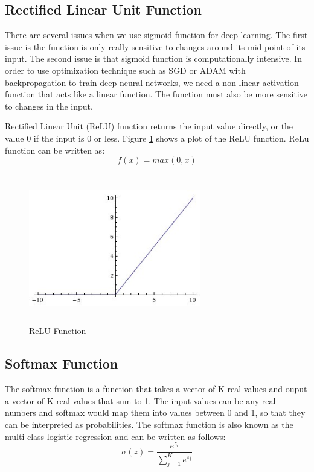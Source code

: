 \subsection{Rectified Linear Unit Function}

There are several issues when we use sigmoid function for deep learning. The first issue is the function is only really sensitive to changes around its mid-point of its input. The second issue is that sigmoid function is computationally intensive. In order to use optimization technique such as SGD or ADAM with backpropagation  to train deep neural networks, we need a non-linear activation function that acts like a linear function. The function must also be more sensitive to changes in the input.

Rectified Linear Unit (ReLU) function returns the input value directly, or the value 0 if the input is 0 or less. Figure \ref{fig:relu} shows a plot of the ReLU function. ReLu function can be written as:
\begin{equation}
    f(x) = max(0,x)
\end{equation}

\begin{figure}[ht]
\includegraphics[width=7.5cm, height=6.5cm]{images/relu.jpeg}
\centering
\caption{ReLU Function}
\label{fig:relu}
\end{figure}
\FloatBarrier

\subsection{Softmax Function}

The softmax function is a function that takes a vector of K real values and ouput a vector of K real values that sum to 1. The input values can be any real numbers and softmax would map them into values between 0 and 1, so that they can be interpreted as probabilities. The softmax function is also known as the multi-class logistic regression and can be written as follows:
\begin{equation}
    \sigma(z) = \frac{e^{z_i}}{\sum_{j=1}^K e^{z_j}}
\end{equation}

